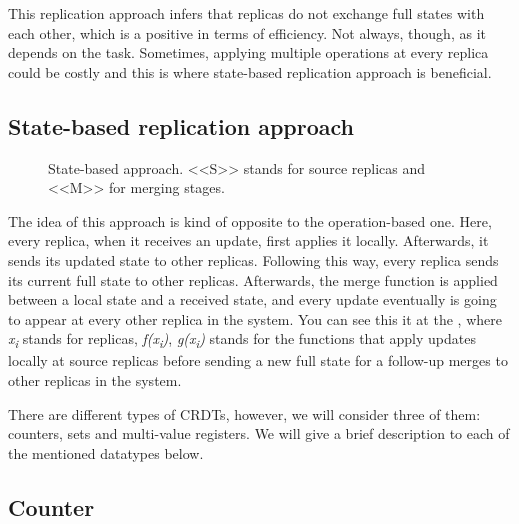 This replication approach infers that replicas do not exchange full states with each other, which is a positive in terms of efficiency. Not always, though, as it depends on the task. Sometimes, applying multiple operations at every replica could be costly and this is where state-based replication approach is beneficial.


\subsection*{State-based replication approach}
\begin{figure}[!htb]
    \begin{center}
    \def\svgwidth{\linewidth}
    
    \caption {State-based approach\cite{2}. <<S>> stands for source replicas and <<M>> for merging stages.}
    \label{fig:theory2}
\end{center}
\end{figure}

The idea of this approach is kind of opposite to the operation-based one. Here, every replica, when it receives an update, first applies it locally. Afterwards, it sends its updated state to other replicas. Following this way, every replica sends its current full state to other replicas. Afterwards, the merge function is applied between a local state and a received state, and every update eventually is going to appear at every other replica in the system. You can see this it at the , where \textit{x\textsubscript{i}} stands for replicas, \textit{f(x\textsubscript{i})}, \textit{g(x\textsubscript{i})} stands for the functions that apply updates locally at source replicas before sending a new full state for a follow-up merges to other replicas in the system.


There are different types of CRDTs, however, we will consider three of them: counters, sets and multi-value registers. We will give a brief description to each of the mentioned datatypes below.

\subsection*{Counter}

